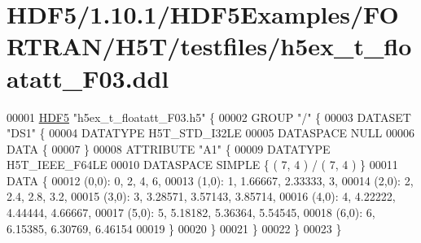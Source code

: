 \hypertarget{_h_d_f5_21_810_81_2_h_d_f5_examples_2_f_o_r_t_r_a_n_2_h5_t_2testfiles_2h5ex__t__floatatt___f03_8ddl_source}{}\section{H\+D\+F5/1.10.1/\+H\+D\+F5\+Examples/\+F\+O\+R\+T\+R\+A\+N/\+H5\+T/testfiles/h5ex\+\_\+t\+\_\+floatatt\+\_\+\+F03.ddl}
\label{_h_d_f5_21_810_81_2_h_d_f5_examples_2_f_o_r_t_r_a_n_2_h5_t_2testfiles_2h5ex__t__floatatt___f03_8ddl_source}

\begin{DoxyCode}
00001 \hyperlink{namespace_h_d_f5}{HDF5} \textcolor{stringliteral}{"h5ex\_t\_floatatt\_F03.h5"} \{
00002 GROUP \textcolor{stringliteral}{"/"} \{
00003    DATASET \textcolor{stringliteral}{"DS1"} \{
00004       DATATYPE  H5T\_STD\_I32LE
00005       DATASPACE  NULL
00006       DATA \{
00007       \}
00008       ATTRIBUTE \textcolor{stringliteral}{"A1"} \{
00009          DATATYPE  H5T\_IEEE\_F64LE
00010          DATASPACE  SIMPLE \{ ( 7, 4 ) / ( 7, 4 ) \}
00011          DATA \{
00012          (0,0): 0, 2, 4, 6,
00013          (1,0): 1, 1.66667, 2.33333, 3,
00014          (2,0): 2, 2.4, 2.8, 3.2,
00015          (3,0): 3, 3.28571, 3.57143, 3.85714,
00016          (4,0): 4, 4.22222, 4.44444, 4.66667,
00017          (5,0): 5, 5.18182, 5.36364, 5.54545,
00018          (6,0): 6, 6.15385, 6.30769, 6.46154
00019          \}
00020       \}
00021    \}
00022 \}
00023 \}
\end{DoxyCode}
